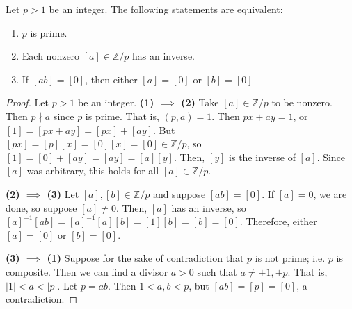 \documentclass [12pt] {article}
\newcommand{\Z}{\mathbb{Z}}
\newenvironment{theorem}[1]{\begin{tcolorbox}[title={Theorem #1},colback=green!5!white,colframe=black!75!green]}{\end{tcolorbox}}
\renewcommand{\bf}[1]{\textbf{{#1}}}
\begin{document}
\begin{theorem}{}
    Let $p > 1$ be an integer. The following statements are equivalent:
    \begin{enumerate}[label=(\arabic*)]
        \item $p$ is prime.
        \item Each nonzero $[a] \in \Z/p$ has an inverse.
        \item If $[ab] = [0]$, then either $[a] = [0]$ or $[b] = [0]$
    \end{enumerate}
\end{theorem}
\begin{proof}
    Let $p > 1$ be an integer.
    \newline
    \bf{(1) $\bm{\implies}$ (2)}
    Take $[a] \in \Z/p$ to be nonzero. Then $p \nmid a$ since $p$ is prime. That is, $(p, a) = 1$.
    Then $px + ay = 1$, or 
    $[1] = [px + ay]  = [px] + [ay]$. But $[px] = [p][x] = [0][x] = [0] \in \Z/p$, so 
    $[1] = [0] + [ay] = [ay] = [a][y]$. Then, $[y]$ is the inverse of $[a]$. Since $[a]$ was
    arbitrary, this holds for all $[a] \in \Z/p$.
    \vspace{0.5em}

    \bf{(2) $\bm{\implies}$ (3)}
    Let $[a], [b] \in \Z/p$ and suppose $[ab] = [0]$. If $[a] = 0$, we are done, so suppose 
    $[a] \neq 0$. Then, $[a]$ has an inverse, so 
    $[a]^{-1} [ab] = [a]^{-1}[a] [b] = [1][b] = [b] = [0]$. Therefore, either $[a] = [0]$ or 
    $[b] = [0]$.
    \vspace{0.5em}

    \bf{(3) $\bm{\implies}$ (1)}
    Suppose for the sake of contradiction that $p$ is not prime; i.e. $p$ is composite. Then we can
    find a divisor $a > 0$ such that $a \neq \pm 1, \pm p$. That is, $|1| < a < |p|$. Let $p = ab$.
    Then $1 < a, b < p$, but $[ab] = [p] = [0]$, a contradiction.
\end{proof}
\end{document}
